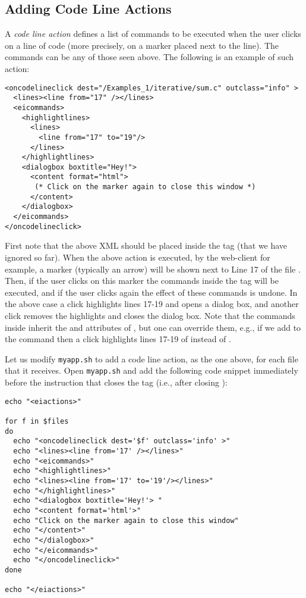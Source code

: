 \subsection{Adding Code Line Actions}

A \emph{code line action} defines a list of commands to be executed when the
user clicks on a line of code (more precisely, on a marker placed next
to the line). The commands can be any of those seen above. The
following is an example of such action:

\medskip
\begin{lstlisting}
<oncodelineclick dest="/Examples_1/iterative/sum.c" outclass="info" >
  <lines><line from="17" /></lines>
  <eicommands>
    <highlightlines>
      <lines>
        <line from="17" to="19"/>
      </lines>
    </highlightlines>
    <dialogbox boxtitle="Hey!"> 
      <content format="html">
       (* Click on the marker again to close this window *)
      </content>
    </dialogbox>
  </eicommands>
</oncodelineclick>
\end{lstlisting}

\medskip
\noindent
First note that the above XML should be placed inside the
 tag (that we have ignored so far).
%
When the above action is executed, by the web-client for example, a
marker (typically an arrow) will be shown next to Line 17 of the file
.
%
Then, if the user clicks on this marker the commands inside the
 tag will be executed, and if the user clicks again
the effect of these commands is undone.
%
In the above case a click highlights lines 17-19 and opens a dialog
box, and another click removes the highlights and closes the dialog
box.
%
Note that the commands inside  inherit the 
and  attributes of , but one can
override them, e.g., if we add
 to the 
command then a click highlights lines 17-19 of  instead of
.
%

Let us modify \texttt{myapp.sh} to add a code line action, as the one
above, for each file that it receives. Open \texttt{myapp.sh} and add
the following code snippet immediately before the instruction that
closes the  tag (i.e., after closing ):

\medskip
\begin{lstlisting}[style=script]
echo "<eiactions>"

for f in $files 
do
  echo "<oncodelineclick dest='$f' outclass='info' >"
  echo "<lines><line from='17' /></lines>"
  echo "<eicommands>"
  echo "<highlightlines>"
  echo "<lines><line from='17' to='19'/></lines>"
  echo "</highlightlines>"
  echo "<dialogbox boxtitle='Hey!'> "
  echo "<content format='html'>"
  echo "Click on the marker again to close this window"
  echo "</content>"
  echo "</dialogbox>"
  echo "</eicommands>"
  echo "</oncodelineclick>"
done

echo "</eiactions>"
\end{lstlisting}


